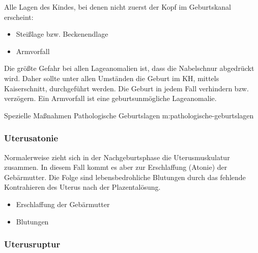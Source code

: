 Alle Lagen des Kindes, bei denen nicht zuerst der 
Kopf im Geburtskanal erscheint:
\begin{itemize}
	\item Steißlage bzw. Beckenendlage
	\item Armvorfall
\end{itemize}
Die größte Gefahr bei allen Lageanomalien ist, dass die
Nabelschnur abgedrückt wird. Daher sollte unter allen
Umständen die Geburt im KH, mittels Kaiserschnitt,
durchgeführt werden. Die Geburt in jedem Fall verhindern
bzw. verzögern. Ein Armvorfall ist eine geburtsunmögliche
Lageanomalie. 

\MassnahmenMK
{Spezielle Maßnahmen}
{Pathologische
Geburtslagen}
{m:pathologische-geburtslagen}
{}{}


\subsubsection{Uterusatonie}

{\TxBeschreibung}
{Normalerweise zieht sich in der Nachgeburtsphase die
Uterusmuskulatur zusammen. In diesem Fall kommt es aber zur
Erschlaffung (Atonie) der Gebärmutter. Die Folge sind
lebensbedrohliche Blutungen durch das fehlende Kontrahieren
des Uterus nach der Plazentalösung.}
{
\begin{itemize}
  \item Erschlaffung der Gebärmutter
  \item Blutungen
\end{itemize}
}
{}
{}
{}





\subsubsection{Uterusruptur}



